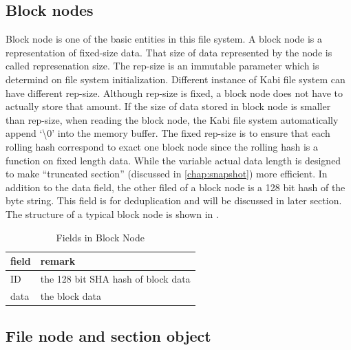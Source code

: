 \subsection{Block nodes}

    Block node is one of the basic entities in this file system. A block node is a representation of fixed-size data. That size of data represented by the node is called represenation size. The rep-size is an immutable parameter which is determind on file system initialization. Different instance of Kabi file system can have different rep-size. Although rep-size is fixed, a block node does not have to actually store that amount. If the size of data stored in block node is smaller than rep-size, when reading the block node, the Kabi file system automatically append `\textbackslash0' into the memory buffer. The fixed rep-size is to ensure that each rolling hash correspond to exact one block node since the rolling hash is a function on fixed length data. While the variable actual data length is designed to make ``truncated section'' (discussed in \cref{chap:snapshot}) more efficient. In addition to the data field, the other filed of a block node is a 128 bit hash of the byte string. This field is for deduplication and will be discussed in later section. The structure of a typical block node is shown in .

\begin{table}
\caption{Fields in Block Node}
\label{tab:block_fields}
\begin{center}
\begin{tabular}{ll}
\toprule
field & remark\\
\midrule
ID & the 128 bit SHA hash of block data\\
data & the block data\\
\bottomrule
\end{tabular}
\end{center}
\end{table}

\subsection{File node and section object}

